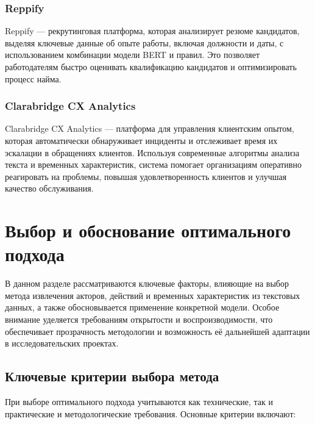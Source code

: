 \subsubsection{Reppify}
Reppify \cite{lib:Reppify} — рекрутинговая платформа, которая анализирует резюме кандидатов, выделяя ключевые данные об опыте работы, включая должности и даты, с использованием комбинации модели BERT и правил. Это позволяет работодателям быстро оценивать квалификацию кандидатов и оптимизировать процесс найма.

\subsubsection{Clarabridge CX Analytics}
Clarabridge CX Analytics \cite{lib:qualtrics} — платформа для управления клиентским опытом, которая автоматически обнаруживает инциденты и отслеживает время их эскалации в обращениях клиентов. Используя современные алгоритмы анализа текста и временных характеристик, система помогает организациям оперативно реагировать на проблемы, повышая удовлетворенность клиентов и улучшая качество обслуживания.

\section{Выбор и обоснование оптимального подхода}

В данном разделе рассматриваются ключевые факторы, влияющие на выбор метода извлечения акторов, действий и временных характеристик из текстовых данных, а также обосновывается применение конкретной модели. Особое внимание уделяется требованиям открытости и воспроизводимости, что обеспечивает прозрачность методологии и возможность её дальнейшей адаптации в исследовательских проектах.

\subsection{Ключевые критерии выбора метода}

При выборе оптимального подхода учитываются как технические, так и практические и методологические требования. Основные критерии включают:

